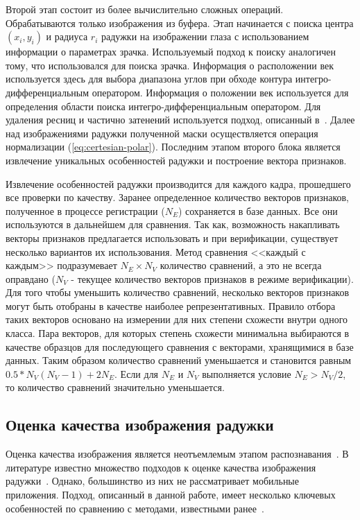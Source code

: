 Второй этап состоит из более вычислительно сложных операций. Обрабатываются только изображения из буфера. Этап начинается с поиска центра $(x_i,y_i)$ и радиуса $r_i$ радужки на изображении глаза с использованием информации о параметрах зрачка. Используемый подход к поиску аналогичен тому, что использовался для поиска зрачка. Информация о расположении век используется здесь для выбора диапазона углов при обходе контура интегро-дифференциальным оператором. Информация о положении век используется для определения области поиска интегро-дифференциальным оператором. Для удаления ресниц и частично затенений используется подход, описанный в~\cite{aligholizadeh_2011}. Далее над изображениями радужки полученной маски осуществляется операция нормализации (\ref{eq:certesian-polar}). Последним этапом второго блока является извлечение уникальных особенностей радужки и построение вектора признаков.

Извлечение особенностей радужки производится для каждого кадра, прошедшего все проверки по качеству. Заранее определенное количество векторов признаков, полученное в процессе регистрации ($N_E$) сохраняется в базе данных. Все они используются в дальнейшем для сравнения. Так как, возможность накапливать векторы признаков предлагается использовать и при верификации, существует несколько вариантов их использования. Метод сравнения <<каждый с каждым>> подразумевает $N_E \times N_V$ количество сравнений, а это не всегда оправдано ($N_V$ - текущее количество векторов признаков в режиме верификации). Для того чтобы уменьшить количество сравнений, несколько векторов признаков могут быть отобраны в качестве наиболее репрезентативных. Правило отбора таких векторов основано на измерении для них степени схожести внутри одного класса. Пара векторов, для которых степень схожести минимальна выбираются в качестве образцов для последующего сравнения с векторами, хранящимися в базе данных. Таким образом количество сравнений уменьшается и становится равным $0.5*N_V(N_V-1)+2N_E$. Если для $N_E$ и $N_V$ выполняется условие $N_E > N_V/2$, то количество сравнений значительно уменьшается.


\subsection{Оценка качества изображения радужки}
\label{subsec:quality_assessment}

Оценка качества изображения является неотъемлемым этапом распознавания~\cite{matveev_doctor_thesis}. В литературе известно множество подходов к оценке качества изображения радужки~\cite{czajka_2013,chen_2012,galbally_2012,feddaoui_2011}. Однако, большинство из них не рассматривает мобильные приложения.
Подход, описанный в данной работе, имеет несколько ключевых особенностей по сравнению с методами, известными ранее~\cite{hamza_patent_2012,prabhakar_patent_2013}.

